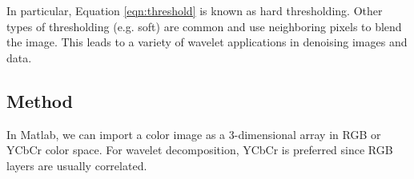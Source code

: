 \documentclass{article}
\theoremstyle{definition}
\begin{document}
  In particular, Equation \eqref{eqn:threshold} is known as hard thresholding. Other types of thresholding (e.g. soft) are common and use neighboring pixels to blend the image. This leads to a variety of wavelet applications in denoising images and data.

  \subsection{Method}
  In Matlab, we can import a color image as a 3-dimensional array in RGB or YCbCr color space. For wavelet decomposition, YCbCr is preferred since RGB layers are usually correlated. 
\end{document}

